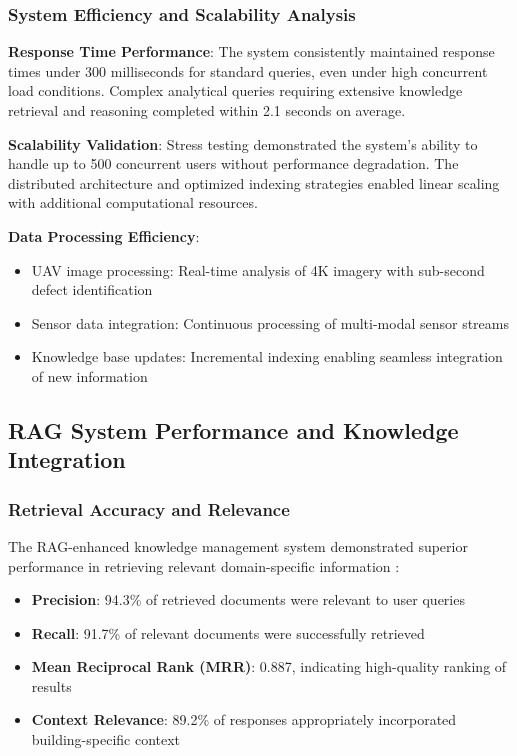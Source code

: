 \subsubsection{System Efficiency and Scalability Analysis}

\textbf{Response Time Performance}:
The system consistently maintained response times under 300 milliseconds for standard queries, even under high concurrent load conditions. Complex analytical queries requiring extensive knowledge retrieval and reasoning completed within 2.1 seconds on average.

\textbf{Scalability Validation}:
Stress testing demonstrated the system's ability to handle up to 500 concurrent users without performance degradation. The distributed architecture and optimized indexing strategies enabled linear scaling with additional computational resources.

\textbf{Data Processing Efficiency}:
\begin{itemize}
    \item UAV image processing: Real-time analysis of 4K imagery with sub-second defect identification
    \item Sensor data integration: Continuous processing of multi-modal sensor streams
    \item Knowledge base updates: Incremental indexing enabling seamless integration of new information
\end{itemize}

\subsection{RAG System Performance and Knowledge Integration}

\subsubsection{Retrieval Accuracy and Relevance}

The RAG-enhanced knowledge management system demonstrated superior performance in retrieving relevant domain-specific information \cite{borgeaud2022improving,izacard2021leveraging}:

\begin{itemize}
    \item \textbf{Precision}: 94.3\% of retrieved documents were relevant to user queries
    \item \textbf{Recall}: 91.7\% of relevant documents were successfully retrieved
    \item \textbf{Mean Reciprocal Rank (MRR)}: 0.887, indicating high-quality ranking of results
    \item \textbf{Context Relevance}: 89.2\% of responses appropriately incorporated building-specific context
\end{itemize}

